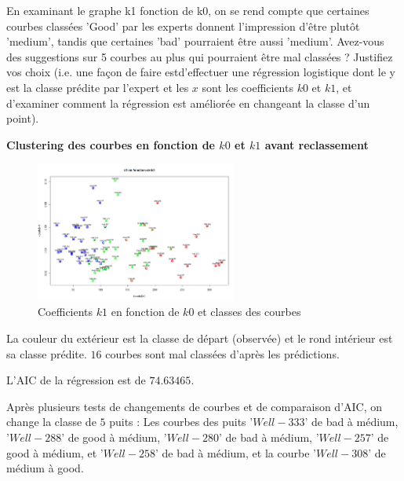 \documentclass[12pt]{article}
\begin{document}
En examinant le graphe k1 fonction de k0, on se rend compte que certaines courbes
class\'ees 'Good' par les experts donnent l'impression d'\^etre plut\^ot 'medium', tandis que
certaines 'bad' pourraient \^etre aussi 'medium'. 
\newline
Avez-vous des suggestions sur 5 courbes au
plus qui pourraient \^etre mal class\'ees ? 
\newline
Justifiez vos choix (i.e. une fa\c con de faire estd'effectuer une r\'egression logistique dont le y est la classe pr\'edite par l'expert et les $x$ sont les coefficients $k0$ et $k1$, et d'examiner comment la r\'egression est am\'elior\'ee en changeant la
classe d'un point).

\textbf{Clustering des courbes en fonction de $k0$ et $k1$ avant reclassement}

\begin{figure}[H]
 \centering %
	\includegraphics[width=250px]{clustering}
  \caption{\label{fig:k0_k1} Coefficients $k1$ en fonction de $k0$ et classes des courbes}
\end{figure}

La couleur du ext\'erieur est la classe de d\'epart (observ\'ee) et le rond int\'erieur est sa classe pr\'edite.
\newline 
$16$ courbes sont mal class\'ees d'apr\`es les pr\'edictions.

L'AIC de la r\'egression est de $74.63465$. 

Apr\`es plusieurs tests de changements de courbes et de comparaison d'AIC, on change la classe de $5$ puits :
\newline
Les courbes des puits '$Well-333$' de bad à médium, '$Well-288$' de good à médium,
'$Well-280$' de bad à médium, '$Well-257$' de good à médium, et '$Well-258$' de bad à médium, et la courbe '$Well-308$' 
de médium à good.

\newpage 
\end{document}
